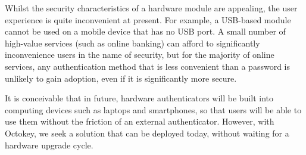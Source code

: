 Whilst the security characteristics of a hardware module are appealing, the user experience is quite
inconvenient at present. For example, a USB-based module cannot be used on a mobile device that has
no USB port. A small number of high-value services (such as online banking) can afford to
significantly inconvenience users in the name of security, but for the majority of online services,
any authentication method that is less convenient than a password is unlikely to gain adoption, even
if it is significantly more secure.

It is conceivable that in future, hardware authenticators will be built into computing devices such
as laptops and smartphones, so that users will be able to use them without the friction of an
external authenticator. However, with Octokey, we seek a solution that can be deployed today, without
waiting for a hardware upgrade cycle.

